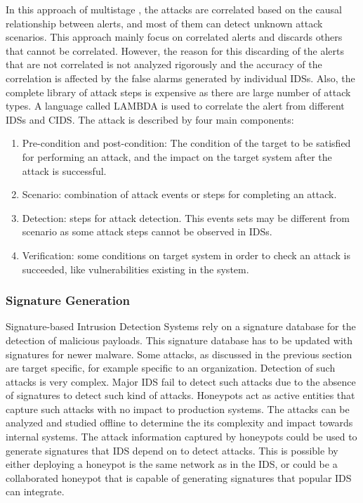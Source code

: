 \documentclass[article,msc=informatik,type=msc,colorback,accentcolor=tud9c]{tudthesis}
\begin{document}
	\vspace{3mm}
	In this approach of multistage , the attacks are correlated based on the causal relationship between alerts, and most of them can detect unknown attack scenarios. This approach mainly focus on correlated alerts and discards others that cannot be correlated. However, the reason for this discarding of the alerts that are not correlated is not analyzed rigorously and the accuracy of the correlation is affected by the false alarms generated by individual \ac{IDS}s. Also, the complete library of attack steps is expensive as there are large number of attack types.	A language called LAMBDA is used to correlate the alert from different \ac{IDS}s and \ac{CIDS}. The attack is described by four main components:
	
	\begin{enumerate}
	\item Pre-condition and post-condition: The condition of the target to be satisfied for performing an attack, and the impact on the target system after the attack is successful.
	\item Scenario: combination of attack events or steps for completing an attack.
	\item Detection: steps for attack detection. This events sets may be different from scenario as some attack steps cannot be observed in \ac{IDS}s.
	\item Verification: some conditions on target system in order to check an attack is succeeded, like vulnerabilities existing in the system.
	\end{enumerate}
	
	
		
	
	\subsubsection{Signature Generation}\label{Signature Generation}
	
	Signature-based Intrusion Detection Systems rely on a signature database for the detection of malicious payloads. This signature database has to be updated with signatures for newer malware. Some attacks, as discussed in the previous section are target specific, for example specific to an organization. Detection of such attacks is very complex. Major IDS fail to detect such attacks due to the absence of signatures to detect such kind of attacks. Honeypots act as active entities that capture such attacks with no impact to production systems. The attacks can be analyzed and studied offline to determine the its complexity and impact towards internal systems. The attack information captured by honeypots could be used to generate signatures that IDS depend on to detect attacks. This is possible by either deploying a honeypot is the same network as in the IDS, or could be a collaborated honeypot that is capable of generating signatures that popular \ac{IDS} can integrate. 
	
\end{document}
